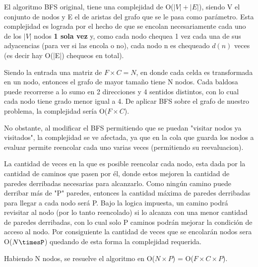  El algoritmo BFS original, tiene una complejidad de O($|V|+|E|$), siendo V el conjunto de nodos y E el de aristas del grafo que se le pasa como parámetro. Esta complejidad es lograda por el hecho de que se encolan necesariamente cada uno de los $|V|$ nodos {\bf 1 sola vez} y, como cada nodo chequea 1 vez cada una de sus adyacencias (para ver si las encola o no), cada nodo n es chequeado $d(n)$ veces (es decir hay O(|E|) chequeos en total). 

Siendo la entrada una matriz de $F \times C = N$, en donde cada celda es transformada en un nodo, entonces el grafo de mayor tamaño tiene N nodos. Cada baldosa puede recorrerse a lo sumo en 2 direcciones y 4 sentidos distintos, con lo cual cada nodo tiene grado menor igual a 4. De aplicar BFS sobre el grafo de nuestro problema, la complejidad sería O($F \times C$).

No obstante, al modificar el BFS permitiendo que se puedan "visitar nodos ya visitados", la complejidad se ve afectada, ya que en la cola que guarda los nodos a evaluar permite reencolar cada uno varias veces (permitiendo su reevaluacion).

La cantidad de veces en la que es posible reencolar cada nodo, esta dada por la cantidad de caminos que pasen por él, donde estos mejoren la cantidad de paredes derribadas necesarias para alcanzarlo. Como ningún camino puede derribar más de "P" paredes, entonces la cantidad máxima de paredes derribadas para llegar a cada nodo será P. Bajo la logica impuesta, un camino podrá revisitar al nodo (por lo tanto reencolado) si lo alcanza con una menor cantidad de paredes derribadas, con lo cual solo P caminos podrán mejorar la condición de acceso al nodo. Por consiguiente la cantidad de veces que se encolarán nodos sera O($N\timesP$) quedando de esta forma la complejidad requerida.













 Habiendo N nodos, se resuelve el algoritmo en O($N \times P$) = O($F \times C \times P$).